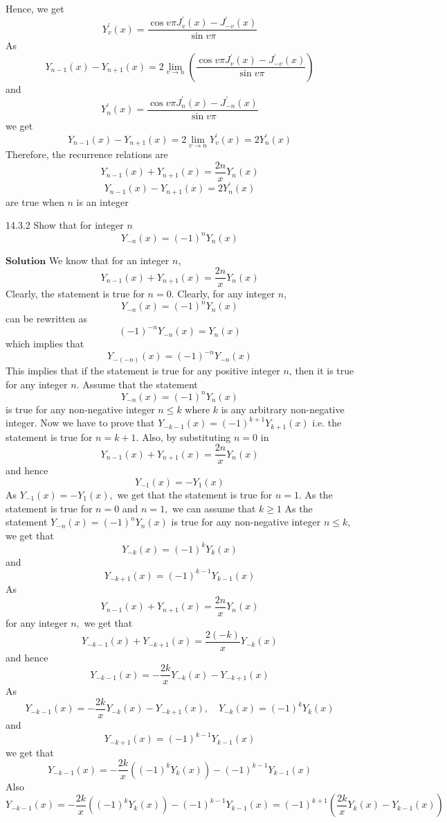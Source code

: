 \documentclass{article}
\begin{document}
\begin{flushleft}
$$$$
Hence, we get
$$
Y_{v}^{\prime}(x)=\frac{\cos v \pi J_{v}^{\prime}(x)-J_{-v}^{\prime}(x)}{\sin v \pi}
$$
As
$$
Y_{n-1}(x)-Y_{n+1}(x)=2 \lim _{v \rightarrow n}\left(\frac{\cos v \pi J_{v}^{\prime}(x)-J_{-v}^{\prime}(x)}{\sin v \pi}\right)
$$
and
$$
Y_{n}^{\prime}(x)=\frac{\cos v \pi J_{n}^{\prime}(x)-J_{-n}^{\prime}(x)}{\sin v \pi}
$$
we get
$$
Y_{n-1}(x)-Y_{n+1}(x)=2 \lim _{v \rightarrow n} Y_{v}^{\prime}(x)=2 Y_{n}^{\prime}(x)
$$
Therefore, the recurrence relations are
$$
Y_{n-1}(x)+Y_{n+1}(x)=\frac{2 n}{x} Y_{n}(x)
$$
$$
Y_{n-1}(x)-Y_{n+1}(x)=2 Y_{n}^{\prime}(x)
$$
are true when $n$ is an integer






\newpage


\begin{mybox}{14.3.2}
Show that for integer $n$
$$
Y_{-n}(x)=(-1)^{n} Y_{n}(x)
$$
\end{mybox}
$\boxed{\textbf{Solution}}$  We know that for an integer $n$, 
$$Y_{n-1}(x)+Y_{n+1}(x)=\frac{2 n}{x} Y_{n}(x)$$ Clearly, the statement is true for $n=0$. Clearly, for any integer $n$, 
$$Y_{-n}(x)=(-1)^{n} Y_{n}(x)$$
can be rewritten as 
$$(-1)^{-n} Y_{-n}(x)=Y_{n}(x)$$ 
which implies that 
$$Y_{-(-n)}(x)=(-1)^{-n} Y_{-n}(x)$$
This implies that if the statement is true for any positive integer $n$, then it is true for any
integer $n$. Assume that the statement 
$$Y_{-n}(x)=(-1)^{n} Y_{n}(x)$$ 
is true for any non-negative integer $n \leq k$ where $k$ is any arbitrary non-negative integer. Now we have to prove that $Y_{-k-1}(x)=(-1)^{k+1} Y_{k+1}(x)$ i.e. the statement is true for $n=k+1$. Also, by substituting $n=0$ in
$$
Y_{n-1}(x)+Y_{n+1}(x)=\frac{2 n}{x} Y_{n}(x)
$$
and hence
$$
Y_{-1}(x)=-Y_{1}(x)
$$
As $Y_{-1}(x)=-Y_{1}(x),$ we get that the statement is true for $n=1$. As the statement is true for $n=0$ and $n=1,$ we can assume that $k \geq 1$
As the statement $Y_{-n}(x)=(-1)^{n} Y_{n}(x)$ is true for any non-negative integer $n \leq k,$ we get that 
$$Y_{-k}(x)=(-1)^{k} Y_{k}(x)$$ 
and 
$$Y_{-k+1}(x)=(-1)^{k-1} Y_{k-1}(x)$$
As 
$$Y_{n-1}(x)+Y_{n+1}(x)=\frac{2 n}{x} Y_{n}(x)$$
for any integer $n,$ we get that 
$$Y_{-k-1}(x)+Y_{-k+1}(x)=\frac{2(-k)}{x} Y_{-k}(x)$$ 
and hence 
$$Y_{-k-1}(x)=-\frac{2 k}{x} Y_{-k}(x)-Y_{-k+1}(x)$$
As 
$$Y_{-k-1}(x)=-\frac{2 k}{x} Y_{-k}(x)-Y_{-k+1}(x), \quad Y_{-k}(x)=(-1)^{k} Y_{k}(x)$$
and 
$$Y_{-k+1}(x)=(-1)^{k-1} Y_{k-1}(x)$$
we get that 
$$Y_{-k-1}(x)=-\frac{2 k}{x}\left((-1)^{k} Y_{k}(x)\right)-(-1)^{k-1} Y_{k-1}(x)$$
Also 
$$Y_{-k-1}(x)=-\frac{2 k}{x}\left((-1)^{k} Y_{k}(x)\right)-(-1)^{k-1} Y_{k-1}(x)=(-1)^{k+1}\left(\frac{2 k}{x} Y_{k}(x)-Y_{k-1}(x)\right)$$


\end{flushleft}
\end{document}
